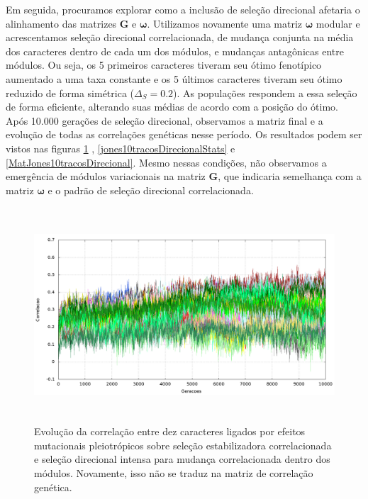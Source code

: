 Em seguida, procuramos explorar como a inclusão de seleção direcional afetaria o
alinhamento das matrizes $\mathbf{G}$ e $\pmb{\omega}$. 
Utilizamos novamente uma matriz $\pmb{\omega}$ modular e acrescentamos seleção
direcional correlacionada, de mudança conjunta na média dos caracteres
dentro de cada um dos módulos, e mudanças antagônicas entre módulos. 
Ou seja, os 5 primeiros caracteres tiveram seu ótimo fenotípico aumentado a
uma taxa constante e os 5 últimos caracteres tiveram seu ótimo reduzido de
forma simétrica ($\Delta_S=0.2$). 
As populações respondem a essa seleção de forma eficiente, alterando
suas médias de acordo com a posição do ótimo. 
Após 10.000 gerações de seleção direcional, observamos a matriz final
e a evolução de todas as correlações genéticas nesse período. 
Os resultados podem ser vistos nas figuras \ref{jones10tracosDirecional}
, \ref{jones10tracosDirecionalStats} e \ref{MatJones10tracosDirecional}. 
Mesmo nessas condições, não observamos a emergência de módulos
variacionais na matriz $\mathbf{G}$, que indicaria semelhança com a matriz $\pmb{\omega}$
e o padrão de seleção direcional correlacionada. 


\begin{figure}[htbp]
    \centering
    \includegraphics[width=150mm, height=80mm]{figuras/jones10tracosDirecional.png}
    \caption{Evolução da correlação entre dez caracteres ligados por efeitos
        mutacionais pleiotrópicos sobre seleção estabilizadora correlacionada
        e seleção direcional intensa para mudança correlacionada dentro dos
    módulos. Novamente, isso não se traduz na matriz de correlação genética.}
    \label{jones10tracosDirecional}
\end{figure}



